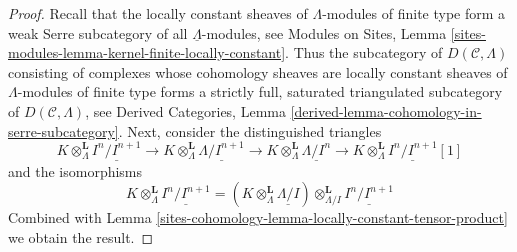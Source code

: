 \begin{proof}
Recall that the locally constant sheaves of $\Lambda$-modules of finite type
form a weak Serre subcategory of all $\underline{\Lambda}$-modules, see
Modules on Sites, Lemma
\ref{sites-modules-lemma-kernel-finite-locally-constant}.
Thus the subcategory of $D(\mathcal{C}, \Lambda)$ consisting of
complexes whose cohomology sheaves are locally constant sheaves
of $\Lambda$-modules of finite type forms a strictly full, saturated
triangulated subcategory of $D(\mathcal{C}, \Lambda)$, see
Derived Categories, Lemma \ref{derived-lemma-cohomology-in-serre-subcategory}.
Next, consider the distinguished triangles
$$
K \otimes_\Lambda^\mathbf{L} \underline{I^n/I^{n + 1}} \to
K \otimes_\Lambda^\mathbf{L} \underline{\Lambda/I^{n + 1}} \to
K \otimes_\Lambda^\mathbf{L} \underline{\Lambda/I^n} \to
K \otimes_\Lambda^\mathbf{L} \underline{I^n/I^{n + 1}}[1]
$$
and the isomorphisms
$$
K \otimes_\Lambda^\mathbf{L} \underline{I^n/I^{n + 1}}
=
\left(K \otimes_\Lambda^\mathbf{L} \underline{\Lambda/I}\right)
\otimes_{\Lambda/I}^\mathbf{L} \underline{I^n/I^{n + 1}}
$$
Combined with Lemma \ref{sites-cohomology-lemma-locally-constant-tensor-product}
we obtain the result.
\end{proof}



